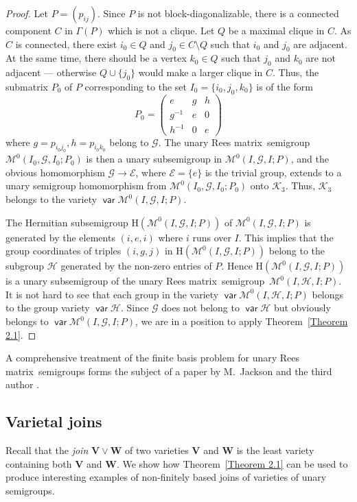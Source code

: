 \documentclass[preprint,1p,times]{elsarticle}
\DeclareMathOperator{\var}{\mathsf{var}}
\numberwithin{equation}{section}
\theoremstyle{remark}
\def\cal{\mathcal}
\def\Mc{{\cal M}}
\def\H{\mathrm H}
\def\Rm{Rees matrix}
\def\sm{semi\-group}
\begin{document}
\begin{proof}
Let $P=(p_{ij})$. Since $P$ is not block-diagonalizable, there is a connected component $C$ in $\Gamma(P)$ which is not
a clique. Let $Q$ be a maximal clique in $C$. As $C$ is connected, there exist $i_0\in Q$ and $j_0\in C\setminus Q$
such that $i_0$ and $j_0$ are adjacent. At the same time, there should be a vertex $k_0\in Q$ such that $j_0$ and $k_0$
are not adjacent --- otherwise $Q\cup\{j_0\}$ would make a larger clique in $C$. Thus, the submatrix $P_0$ of $P$
corresponding to the set $I_0=\{i_0,j_0,k_0\}$ is of the form
$$P_0=\begin{pmatrix}
e      & g & h\\
g^{-1} & e & 0\\
h^{-1} & 0 & e
\end{pmatrix}$$
where $g=p_{i_0j_0},h=p_{i_0k_0}$ belong to $\mathcal{G}$. The unary \Rm\ \sm\ $\Mc^0(I_0,\mathcal{G},I_0;P_0)$ is then
a unary subsemigroup in $\Mc^0(I,\mathcal{G},I;P)$, and the obvious homomorphism $\mathcal{G}\to \mathcal{E}$, where
$\mathcal{E}=\{e\}$ is the trivial group, extends to a unary semigroup homomorphism from
$\Mc^0(I_0,\mathcal{G},I_0;P_0)$ onto $\mathcal{K}_3$. Thus, $\mathcal{K}_3$ belongs to the variety
$\var\Mc^0(I,\mathcal{G},I;P)$.

The Hermitian subsemigroup $\H(\Mc^0(I,\mathcal{G},I;P))$ of $\Mc^0(I,\mathcal{G},I;P)$ is generated by the elements
$(i,e,i)$ where $i$ runs over $I$. This implies that the group coordinates of triples $(i,g,j)$ in
$\H(\Mc^0(I,\mathcal{G},I;P))$ belong to the subgroup $\mathcal{H}$ generated by the non-zero entries of $P$. Hence
$\H(\Mc^0(I,\mathcal{G},I;P))$ is a unary subsemigroup of the unary \Rm\ \sm\ $\Mc^0(I,\mathcal{H},I;P)$. It is not
hard to see that each group in the variety $\var\Mc^0(I,\mathcal{H},I;P)$ belongs to the group variety $\var
\mathcal{H}$. Since $\mathcal{G}$ does not belong to $\var\mathcal{H}$ but obviously belongs to
$\var\Mc^0(I,\mathcal{G},I;P)$, we are in a position to apply Theorem~\ref{Theorem 2.1}.
\end{proof}

A comprehensive treatment of the finite basis problem for unary \Rm\ semigroups forms the subject of a paper by
M.~Jackson and the third author \cite{jacksonvolkov}.

\subsection{Varietal joins}
Recall that the \emph{join} $\mathbf{V}\vee\mathbf{W}$ of two varieties $\mathbf{V}$ and $\mathbf{W}$ is the least
variety containing both $\mathbf{V}$ and $\mathbf{W}$. We show how Theorem~\ref{Theorem 2.1} can be used to produce
interesting examples of non-finitely based joins of varieties of unary semigroups.
\end{document}
